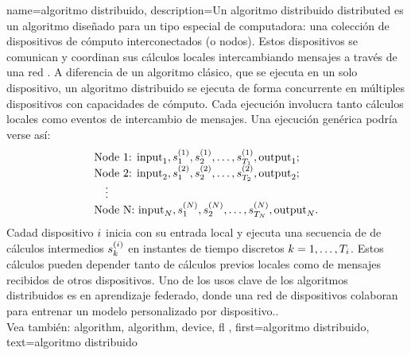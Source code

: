 {name={algoritmo distribuido},
	description={Un algoritmo distribuido distributed es un algoritmo diseñado para 
		un tipo especial de computadora: una colección de dispositivos de cómputo interconectados (o nodos). 
		Estos dispositivos se comunican y coordinan sus cálculos locales intercambiando mensajes
		a través de una red \cite{IntroDistAlg,ParallelDistrBook}. A diferencia de un algoritmo clásico,
		que se ejecuta en un solo dispositivo, un algoritmo distribuido   
		se ejecuta de forma concurrente en múltiples dispositivos con capacidades de cómputo. 
		Cada ejecución involucra tanto cálculos locales como eventos de intercambio de mensajes. 
		Una ejecución genérica podría verse así: 
		\[
		\begin{array}{l}
			\text{Node 1: } {\rm input}_1, s_1^{(1)}, s_2^{(1)}, \ldots, s_{T_1}^{(1)}, {\rm output}_1; \\
			\text{Node 2: } {\rm input}_2, s_1^{(2)}, s_2^{(2)}, \ldots, s_{T_2}^{(2)}, {\rm output}_2; \\
			\quad \vdots \\
			\text{Node N: } {\rm input}_N, s_1^{(N)}, s_2^{(N)}, \ldots, s_{T_N}^{(N)}, {\rm output}_N.
		\end{array}
		\]
		Cadad dispositivo  $i$ inicia con su entrada local y ejecuta una secuencia de 
		de cálculos intermedios $s_{k}^{(i)}$ en instantes de tiempo discretos $k = 1, \dots, T_i$. 
		Estos cálculos pueden depender tanto de cálculos previos locales como de mensajes recibidos de otros dispositivos.
		Uno de los usos clave de los algoritmos distribuidos es en aprendizaje federado, donde una red de 
		dispositivos colaboran para entrenar un modelo personalizado por dispositivo.. 
		\\
		 Vea también: \gls{algorithm}, \gls{algorithm}, \gls{device}, \gls{fl}  },
	first={algoritmo distribuido}, text={algoritmo distribuido}
}



